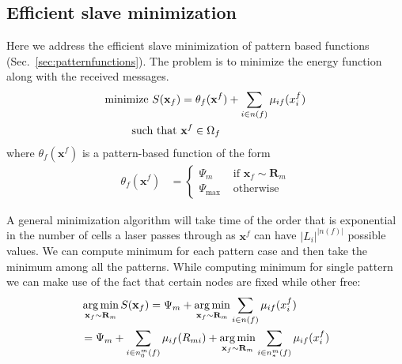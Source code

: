\documentclass[letterpaper, 10 pt, conference]{ieeeconf} %
\DeclareMathOperator*{\argmin}{arg\,min}
\newcommand{\vect}[1]{\mathbf{#1}}
\begin{document}
\subsection{Efficient slave minimization}
Here we address the efficient slave minimization of pattern based functions (Sec.~\ref{sec:patternfunctions}). 
The problem is to minimize the energy function along with the received messages.
\begin{equation}
  \begin{split}
    \text{minimize }  S(\vect{x}_f) &=\theta_f(\vect{x}^f) + \sum_{i \in n(f)}\msg{i}{f}{x_i^f} \\
   \text{such that }  &\vect{x}^f \in \Omega_f
  \end{split}
\end{equation}
where $\theta_f(\vect{x}^f)$ is a pattern-based function of the form
\begin{align}
  \theta_f(\vect{x}^f) &= \begin{cases}
                \Psi_m & \text{ if $\vect{x}_f \sim \vect{R}_m$}\\
     \Psi_{\text{max}} & \text{ otherwise}
  \end{cases}
\end{align}

A general minimization algorithm will take time of the order that is
exponential in the number of cells a laser passes through as $\vect{x}^f$ can
have $|L_i|^{|n(f)|}$ possible values.
We can compute minimum for each pattern case and then take the minimum among all the patterns. While computing minimum for single pattern we can make use of the fact that certain nodes are fixed while other free:
\begin{align}
  &\argmin_{\vect{x}_f \sim \vect{R}_m} S(\vect{x}_f) 
  = \Psi_m + \argmin_{\vect{x}_f \sim \vect{R}_m} \sum_{i \in n(f)}\msg{i}{f}{x_i^f}\\
  &= \Psi_m + \sum_{i \in n^m_0(f)}\msg{i}{f}{R_{mi}} 
  + \argmin_{\vect{x}_f \sim \vect{R}_m} \sum_{i \in n^m_*(f)}\msg{i}{f}{x_i^f}
\end{align}
\end{document}
